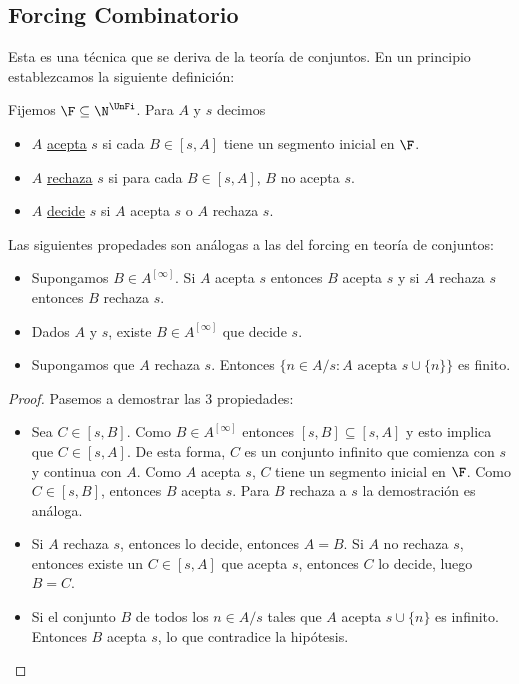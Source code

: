 \subsection{Forcing Combinatorio}

Esta es una técnica que se deriva de la teoría de conjuntos. En un principio establezcamos la siguiente definición:

\begin{defn}
    Fijemos $\F \subseteq \N^{\UnFi}$. Para $A$ y $s$ decimos
    
    \begin{itemize}
        \item $A$ \ul{acepta} $s$ si cada $B \in [s,A]$ tiene un segmento inicial en $\F$.
        \item $A$ \ul{rechaza} $s$ si para cada $B \in [s,A]$, $B$ no acepta $s$.
        \item $A$ \ul{decide} $s$ si $A$ acepta $s$ o $A$ rechaza $s$.
    \end{itemize}
\end{defn}

\begin{teo}
    Las siguientes propedades son análogas a las del forcing en teoría de conjuntos:
    
    \begin{itemize}
        \item Supongamos $B \in A^{[\infty]}$. Si $A$ acepta $s$ entonces $B$ acepta $s$ y si $A$ rechaza $s$ entonces $B$ rechaza $s$.
        \item Dados $A$ y $s$, existe $B \in A^{[\infty]}$ que decide $s$.
        \item Supongamos que $A$ rechaza $s$. Entonces $\{n \in A/s : A \text{ acepta } s \cup \{n\}\}$ es finito.
    \end{itemize}
\end{teo}

\begin{proof}
    Pasemos a demostrar las 3 propiedades:
    
    \begin{itemize}
        \item Sea $C \in [s, B]$. Como $B \in A^{[\infty]}$ entonces $[s,B] \subseteq [s,A]$ y esto implica que $C \in [s,A]$. De esta forma, $C$ es un conjunto infinito que comienza con $s$ y continua con $A$. Como $A$ acepta $s$, $C$ tiene un segmento inicial en $\F$. Como $C \in [s,B]$, entonces $B$ acepta $s$. Para $B$ rechaza a $s$ la demostración es análoga.
        \item Si $A$ rechaza $s$, entonces lo decide, entonces $A=B$. Si $A$ no rechaza $s$, entonces existe un $C \in [s,A]$ que acepta $s$, entonces $C$ lo decide, luego $B = C$.
        \item Si el conjunto $B$ de todos los $n \in A/s$ tales que $A$ acepta $s \cup \{n\}$ es infinito. Entonces $B$ acepta $s$, lo que contradice la hipótesis.
    \end{itemize}
\end{proof}

